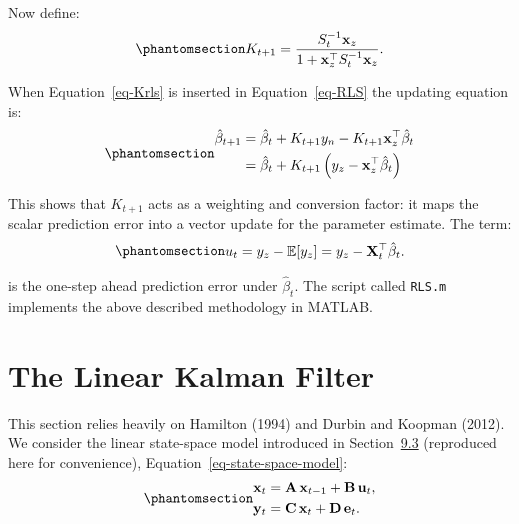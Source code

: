 \documentclass[
  letterpaper,
  DIV=11,
  numbers=noendperiod]{scrreprt}
\begin{document}
Now define: \begin{equation}\protect\phantomsection\label{eq-Krls}{  
\begin{align}
    K_{t+1} = \frac{S_t^{-1} \mathbf{x}_z}{1 + \mathbf{x}_z^{\top} S_t^{-1} \mathbf{x}_z}.
\end{align}
}\end{equation}

When Equation~\ref{eq-Krls} is inserted in Equation~\ref{eq-RLS} the
updating equation is:
\begin{equation}\protect\phantomsection\label{eq-gen-0104}{  
\begin{align}
 \nonumber
   \hat{\beta}_{t+1} &= \hat{\beta}_{t} + K_{t+1} y_n - K_{t+1} \mathbf{x}_{z}^{\top}  \hat{\beta}_{t} \\ 
   &= \hat{\beta}_{t} + K_{t+1} \left( y_z - \mathbf{x}_z^{\top} \hat{\beta}_{t} \right) 
\end{align}
}\end{equation}

This shows that \(K_{t+1}\) acts as a weighting and conversion factor:
it maps the scalar prediction error into a vector update for the
parameter estimate. The term:
\begin{equation}\protect\phantomsection\label{eq-gen-0105}{  
\begin{align}
    u_t = y_z - \mathbb{E}[y_z] = y_z - \mathbf{X}_t^{\top} \hat{\beta}_t.
\end{align}
}\end{equation}

is the one-step ahead prediction error under \(\hat{\beta}_t\). The
script called \texttt{RLS.m} implements the above described methodology
in MATLAB.

\section{The Linear Kalman Filter}\label{sec:lkf}

This section relies heavily on Hamilton (1994) and Durbin and Koopman
(2012). We consider the linear state-space model introduced in
Section~\hyperref[sec:LSSM]{9.3} (reproduced here for convenience),
Equation~\ref{eq-state-space-model}:
\begin{equation}\protect\phantomsection\label{eq-gen-0106}{ 
\begin{align}
  \mathbf{x}_{t} &= \mathbf{A}\,\mathbf{x}_{t-1} + \mathbf{B}\,\mathbf{u}_t, \\
  \mathbf{y}_{t} &= \mathbf{C}\,\mathbf{x}_{t} + \mathbf{D}\,\mathbf{e}_t. 
\end{align}
}\end{equation}
\end{document}

